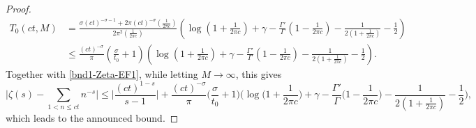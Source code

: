 \documentclass[11pt,letterpaper,oneside,reqno]{amsart}
\renewcommand{\^}[1]{\widehat{#1}}
\newcommand{\s}{\sigma}
\numberwithin{equation}{section}
\theoremstyle{remark}
\begin{document}
\begin{proof}
\begin{align*}
T_0(ct,M) & =  
\frac{ \s (ct)^{-\s-1} + 2\pi (ct)^{-\s} \left(\frac1{2\pi c} \right)}{2\pi^2 \left(\frac1{2\pi c}\right)}\left(\log\left(1+\frac1{2\pi c}\right) + \gamma - \frac{\Gamma'}{\Gamma}\left(1-\frac1{2\pi c} \right)-\frac{1}{2(1+\frac{1}{2\pi c})}-\frac{1}{2}\right) 
\\ & \leq \frac{(ct)^{-\s}}{\pi } \left( \frac{\s}{t_0} + 1 \right) \left( \log (1+\frac{1}{2\pi c} ) + \gamma - \frac{\Gamma'}{\Gamma}\left(1-\frac{1}{2\pi c}\right)-\frac{1}{2(1+\frac{1}{2\pi c})}-\frac{1}{2}\right). 
\end{align*}
Together with \eqref{bnd1-Zeta-EF1}, while letting $M\to\infty$, this gives 
 \[
\bigg|\zeta(s) - \sum_{1<n\leq ct}n^{-s} \bigg|
\leq  \bigg|\frac{(ct)^{1-s}}{s-1} \bigg|
 + \frac{(ct)^{-\s}}{\pi } 
\Big( \frac{\s}{t_0} + 1 \Big) \bigg( \log \Big(1+\frac{1}{2\pi c} \Big) + \gamma - \frac{\Gamma'}{\Gamma} \Big(1-\frac{1}{2\pi c}\Big) - \frac{1}{2(1+\frac{1}{2\pi c})}-\frac{1}{2}\bigg) ,
\]
which leads to the announced bound.
    \end{proof}
\end{document}
